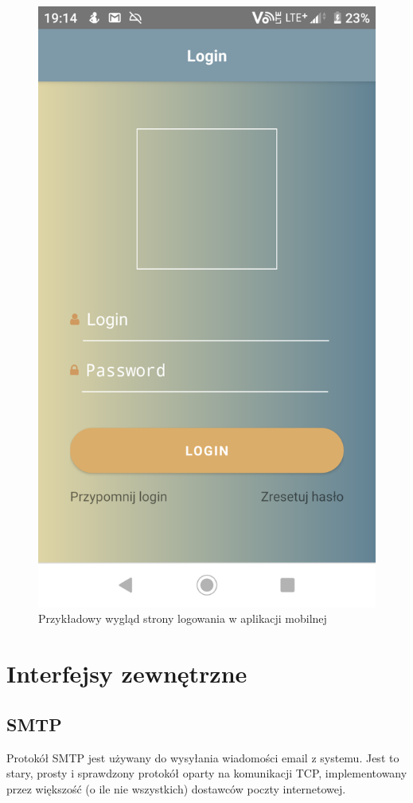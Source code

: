 \documentclass{article}
\begin{document}
\begin{figure}[H]
\centering
\includegraphics[scale=0.15]{images/mobileLogin.png}
\caption{Przykładowy wygląd strony logowania w aplikacji mobilnej}
\end{figure}

\section{Interfejsy zewnętrzne}
\subsection{SMTP}
Protokół SMTP jest używany do wysyłania wiadomości email z systemu. Jest to stary, prosty i sprawdzony protokół oparty na komunikacji TCP, implementowany przez większość (o ile nie wszystkich) dostawców poczty internetowej.
\end{document}
